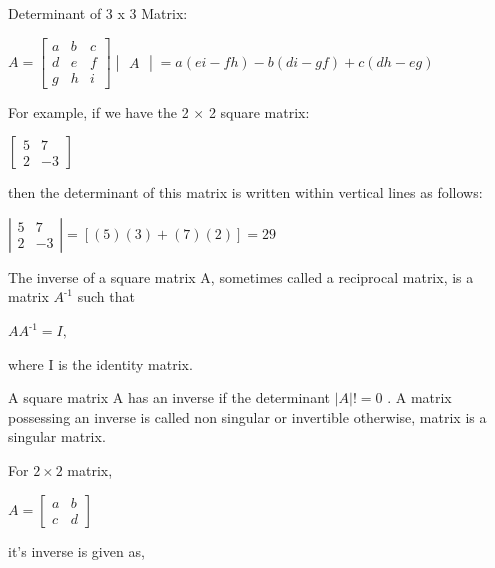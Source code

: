 \documentclass[a4paper,12pt]{article}
\begin{document}
\begin{flushleft}
\begin{flushleft}
\begin{flushleft}
Determinant of 3 x 3 Matrix:
\newline

 $A = \begin{bmatrix} a & b & c\\  d & e & f\\  g & h & i \end{bmatrix}  \begin{vmatrix} A \end{vmatrix}= a(ei-fh)-b(di-gf)+c(dh-eg)$
 \newline

For example, if we have the 2 $\times$ 2 square matrix:

\begin{center}
    $\begin{bmatrix}{5}&{7}\\{2}&-{3}\end{bmatrix}$
\end{center}
\newline

then the determinant of this matrix is written within vertical lines as follows:
\begin{center}
    $\displaystyle{\left|\begin{matrix}{5}&{7}\\{2}&-{3}\end{matrix}\right|} = [(5)(3)+(7)(2)] = 29$
\end{center}
\newline


The inverse of a square matrix A, sometimes called a reciprocal matrix, is a matrix $A^{\mbox{-}1}$ such that

  $A A^{\mbox{-}1}=I,$ 	
  
where I is the identity matrix. 
\newline


A square matrix A has an inverse if the determinant $|A|! = 0$ . A matrix possessing an inverse is called non singular or invertible otherwise, matrix is a singular matrix.
\newline

For  $2 \times 2$ matrix, 
\newline

 $ A = \begin{bmatrix}
 a & b\\
 c & d
 \end{bmatrix}$
\newline

it's inverse is given as,
\newline


\end{flushleft}
\end{flushleft}
\end{flushleft}
\end{document}
